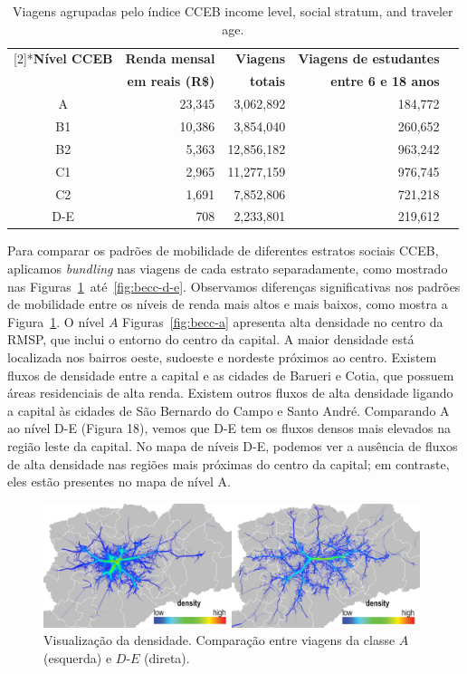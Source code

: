 \begin{table}[!htb]
  \small
  \newcommand{\hdr}[1]{\bfseries#1}
  \centering
  \caption{Viagens agrupadas pelo índice CCEB income level, social stratum, and traveler age.\label{tab:becc}}
  \begin{tabular}{>{\footnotesize}c>{\footnotesize}r>{\footnotesize}r>{\footnotesize}r>{\footnotesize}r}
    \toprule
    \multirow{2}[2]{*}{\hdr{Nível CCEB}} & \hdr{Renda mensal} & \hdr{Viagens} & \hdr{Viagens de estudantes}\\
    & \hdr{em reais (R\$)} & \hdr{totais} & \hdr{entre 6 e 18 anos}\\
    \midrule
    A   & 23,345    & 3,062,892  &   184,772\\
    B1  & 10,386    & 3,854,040  &   260,652\\
    B2  & 5,363     & 12,856,182 &   963,242\\
    C1  & 2,965     & 11,277,159 &   976,745\\
    C2  & 1,691     & 7,852,806  &   721,218\\
    D-E & 708       & 2,233,801  &   219,612\\
    \bottomrule
  \end{tabular}
\end{table}

Para comparar os padrões de mobilidade de diferentes estratos sociais CCEB,
aplicamos \emph{bundling} nas viagens de cada estrato separadamente, como
mostrado nas Figuras~\ref{fig:becc-axd-e}~até~\ref{fig:becc-d-e}. Observamos
diferenças significativas nos padrões de mobilidade entre os níveis de renda
mais altos e mais baixos, como mostra a Figura~\ref{fig:becc-axd-e}. O nível $A$
Figuras~\ref{fig:becc-a} apresenta alta densidade no centro da RMSP, que inclui
o entorno do centro da capital. A maior densidade está localizada nos bairros
oeste, sudoeste e nordeste próximos ao centro. Existem fluxos de densidade entre
a capital e as cidades de Barueri e Cotia, que possuem áreas residenciais de
alta renda. Existem outros fluxos de alta densidade ligando a capital às cidades
de São Bernardo do Campo e Santo André. Comparando A ao nível D-E (Figura 18),
vemos que D-E tem os fluxos densos mais elevados na região leste da capital. No
mapa de níveis D-E, podemos ver a ausência de fluxos de alta densidade nas
regiões mais próximas do centro da capital; em contraste, eles estão presentes
no mapa de nível A.

\begin{figure}[!htb]
  \centering
  \captionsetup{justification=centering}
  \includegraphics[width=0.98\textwidth]{../figuras/comparison-axd-e-strata-leg.png}
  \caption{Visualização da densidade. Comparação entre viagens da classe $A$ (esquerda) e $D$-$E$ (direta). \label{fig:becc-axd-e}}
\end{figure}


